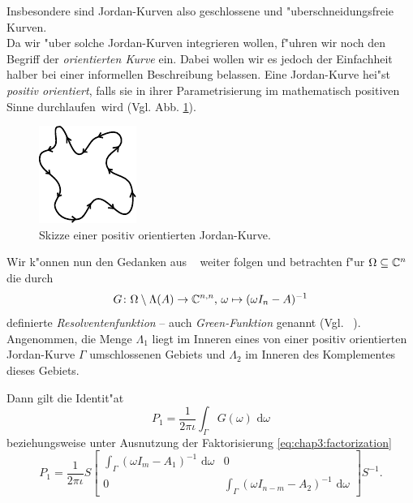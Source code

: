 Insbesondere sind Jordan-Kurven also geschlossene und "uberschneidungsfreie Kurven.\\

Da wir "uber solche Jordan-Kurven integrieren wollen, f"uhren wir noch den Begriff der \emph{orientierten Kurve} ein.
Dabei wollen wir es jedoch der Einfachheit halber bei einer informellen Beschreibung belassen.
Eine Jordan-Kurve hei"st \emph{positiv orientiert},
falls sie in ihrer Parametrisierung im mathematisch positiven Sinne \glqq durchlaufen\grqq\ wird (Vgl. Abb. \ref{im:chap3:jKurveOrientiert}).

\newpage

\begin{figure}[h!]
\center
\includegraphics[width=.27\linewidth]{images/jKurveOrientiert}
\caption{Skizze einer positiv orientierten Jordan-Kurve.}\label{im:chap3:jKurveOrientiert}
\end{figure}




Wir k"onnen nun den Gedanken aus ~\cite[Abschnitt 4.9]{liesen} weiter folgen und betrachten f"ur $\Omega\subseteq\mathbb{C}^n$ die durch
\[
G\colon\Omega \setminus \Lambda(A) \to\mathbb{C}^{n,n}
\text{, }
\omega \mapsto (\omega I_n - A)^{-1}
\]
definierte \emph{Resolventenfunktion} -- auch \emph{Green-Funktion} genannt (Vgl. ~\cite{polizzi}).
Angenommen, die Menge $\Lambda_1$ liegt im Inneren eines von einer positiv orientierten Jordan-Kurve $\Gamma$ umschlossenen
Gebiets und $\Lambda_2$ im Inneren des Komplementes dieses Gebiets.

Dann gilt die Identit"at
\begin{equation}\label{eq:chap3:kontur}
P_1 = \frac{1}{2\pi\iota}\int_\Gamma G(\omega)\text{ d}\omega
\end{equation}
beziehungsweise unter Ausnutzung der Faktorisierung \eqref{eq:chap3:factorization}
\begin{equation}\label{eq:chap3:konturMatrix}
P_1 = \frac{1}{2\pi\iota} S
\begin{bmatrix}
\int_\Gamma (\omega I_m - A_1)^{-1} \text{ d}\omega & 0 \\
0 & \int_\Gamma (\omega I_{n-m} - A_2)^{-1} \text{ d}\omega
\end{bmatrix} S^{-1}.
\end{equation}

